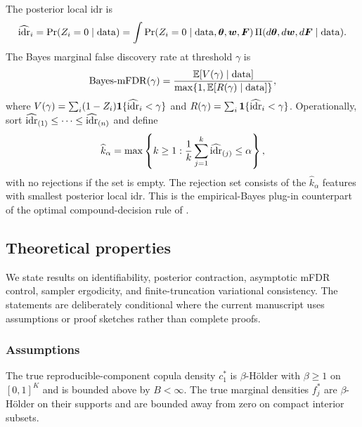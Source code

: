 The posterior local idr is
\begin{equation}
\widehat{\mathrm{idr}}_i=\Pr(Z_i=0\mid\mathrm{data})=
\int \Pr(Z_i=0\mid\mathrm{data},\bm{\theta},\bm{w},\bm F)\,\Pi(d\bm{\theta},d\bm{w},d\bm F\mid\mathrm{data}).
\label{eq:idr}
\end{equation}
The Bayes marginal false discovery rate at threshold $\gamma$ is
\begin{equation}
\mathrm{Bayes\text{-}mFDR}(\gamma)=
\frac{\mathbb{E}[V(\gamma)\mid\mathrm{data}]}{\max\{1,\mathbb{E}[R(\gamma)\mid\mathrm{data}]\}},
\label{eq:bayes-mfdr}
\end{equation}
where $V(\gamma)=\sum_i(1-Z_i)\bm{1}\{\widehat{\mathrm{idr}}_i<\gamma\}$ and $R(\gamma)=\sum_i\bm{1}\{\widehat{\mathrm{idr}}_i<\gamma\}$. Operationally, sort $\widehat{\mathrm{idr}}_{(1)}\leq\cdots\leq\widehat{\mathrm{idr}}_{(n)}$ and define
\begin{equation}
\widehat k_\alpha=\max\left\{k\geq1:\frac{1}{k}\sum_{j=1}^k \widehat{\mathrm{idr}}_{(j)}\leq \alpha\right\},
\label{eq:step-up}
\end{equation}
with no rejections if the set is empty. The rejection set consists of the $\widehat k_\alpha$ features with smallest posterior local idr. This is the empirical-Bayes plug-in counterpart of the optimal compound-decision rule of \citet{SunCai2007}.

\subsection{Theoretical properties}
\label{sec:theory}

We state results on identifiability, posterior contraction, asymptotic mFDR control, sampler ergodicity, and finite-truncation variational consistency. The statements are deliberately conditional where the current manuscript uses assumptions or proof sketches rather than complete proofs.

\subsubsection{Assumptions}

\begin{assumption}
\label{ass:smooth}
The true reproducible-component copula density $c_1^*$ is $\beta$-H\"older with $\beta\geq1$ on $[0,1]^K$ and is bounded above by $B<\infty$. The true marginal densities $f_j^*$ are $\beta$-H\"older on their supports and are bounded away from zero on compact interior subsets.
\end{assumption}

